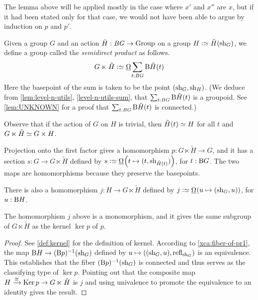 The lemma above will be applied mostly in the case where $x'$ and $x''$ are $x$, but if it had been stated only for that case, we would not have
been able to argue by induction on $p$ and $p'$.

\begin{definition}\label{def:semidirect-product}
  Given a group $G$ and an action $\tilde H : \mathit{B}\mathit{G} \to \mathrm{Group}$ on a group $H \defeq \tilde H(\sh_G)$, we define a group called the {\em
    semidirect product} as follows.
  $$G \ltimes \tilde H \defeq \mkgroup { \sum_{t:\BG} \B \tilde H(t) }$$
  Here the basepoint of the sum is taken to be the point $(\mathrm{sh}_G,\mathrm{sh}_H)$.
  (We deduce from \cref{lem:level-n-utils}, \cref{level-n-utils-sum}, that $\sum_{t:\mathit{B}\mathit{G}} \mathrm{B} \tilde H(t)$ is a groupoid.
  See \cref{lem:UNKNOWN} for a proof that $\sum_{t:\mathit{B}\mathit{G}} \mathrm{B} \tilde H(t)$ is connected.)
\end{definition}

Observe that if the action of $G$ on $H$ is trivial, then $\tilde H(t) \jdeq H$ for all $t$ and $G \ltimes \tilde H \jdeq G \times H$.

Projection onto the first factor gives a homomorphism $p : G \ltimes \tilde H \to G$, and it has a section $s : G \to G \ltimes \tilde H$ defined by 
$ s \defeq \mkgroup {\left( t \mapsto (t,\sh_{\tilde H(t)}) \right) }$, for $t : \mathrm{B} G$.  The two maps are homomorphisms because they preserve the basepoints.

There is also a homomorphism $j : H \to G \ltimes \tilde H$ defined by $j \defeq \mkgroup { \left( u \mapsto (\sh_G,u) \right) }$, for $u : \mathrm{B} H$.

\begin{lemma}
  The homomorphism $j$ above is a monomorphism, and it gives the same subgroup of $G \ltimes \tilde H$ as the kernel $\ker p$ of $p$.
\end{lemma}

\begin{proof}
  See \ref{def:kernel} for the definition of kernel.  According to \cref{xca:fiber-of-pr1}, the map $\mathrm{B} H \to (\mathrm{B} p)^{-1}(\mathrm{sh}_G)$ defined by
  $ u \mapsto ((\sh_G,u), \refl{\sh_G}) $ is an equivalence.  This establishes that the fiber $(\mathrm{B} p)^{-1}(\mathrm{sh}_G)$ is connected and thus serves as
  the classifying type of $\ker p$.  Pointing out that the composite map $H \xrightarrow{\isom} \ker p \to G \ltimes \tilde H$ is $j$ and using
  univalence to promote the equivalence to an identity gives the result.
\end{proof}

